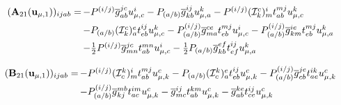 \begin{subappendices}
\begin{equation}
    \begin{array}{r@{\,}l}
        (\mathbf{A}_{21}(\mathbf{u}_{\mu,1}))_{ijab}
        =
        &
        -
        P^{(i/j)}
        \overline{g}_{ab}^{jc}
        u_{\mu,c}^i
        -
        P_{(a/b)}
        \overline{g}_{kb}^{ij}
        u_{\mu,a}^k
        -
        P^{(i/j)}
        (\mathcal{I}_k^c)_m^i
        t_{ab}^{mj}
        u_{\mu,c}^k
        \\[5pt]
        &
        -
        P_{(a/b)}
        (\mathcal{I}_k^c)_a^e
        t_{eb}^{ij}
        u_{\mu,c}^k
        -
        P_{(a/b)}^{(i/j)}
        \overline{g}_{ma}^{ce}
        t_{eb}^{mj}
        u_{\mu,c}^i
        -
        P_{(a/b)}^{(i/j)}
        \overline{g}_{km}^{ie}
        t_{eb}^{mj}
        u_{\mu,a}^k
        \\[5pt]
        &
        -
        \tfrac{1}{2}
        P^{(i/j)}
        \overline{g}_{mn}^{jc}
        t_{ab}^{mn}
        u_{\mu,c}^i
        -
        \tfrac{1}{2}
        P_{(a/b)}
        \overline{g}_{kb}^{ef}
        t_{ef}^{ij}
        u_{\mu,a}^k
    \end{array}
\end{equation}

\begin{equation}
    \begin{array}{r@{\,}l}
        (\mathbf{B}_{21}(\mathbf{u}_{\mu,1}))_{ijab}
        =
        &
        -
        P^{(i/j)}
        (\mathcal{I}_c^k)_m^i
        t_{ab}^{mj}
        u_{\mu,k}^c
        -
        P_{(a/b)}
        (\mathcal{I}_c^k)_a^e
        t_{eb}^{ij}
        u_{\mu,k}^c
        -
        P_{(a/b)}^{(i/j)}
        \overline{g}_{cb}^{je}
        t_{ae}^{ik}
        u_{\mu,k}^c
        \\[5pt]
        &
        -
        P_{(a/b)}^{(i/j)}
        \overline{g}_{kj}^{mb}
        t_{ac}^{im}
        u_{\mu,k}^c
        -
        \overline{g}_{mc}^{ij}
        t_{ab}^{km}
        u_{\mu,k}^c
        -
        \overline{g}_{ab}^{ke}
        t_{ce}^{ij}
        u_{\mu,k}^c
    \end{array}
\end{equation}


\end{subappendices}
